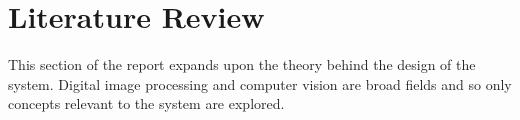 \chapter{Literature Review}
This section of the report expands upon the theory behind the design of the system. Digital image processing and computer vision are broad fields and so only concepts relevant to the system are explored.









